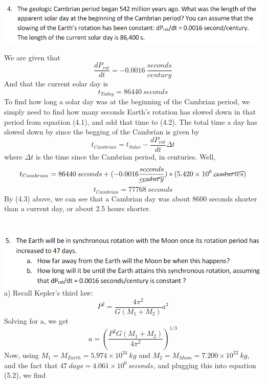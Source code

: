 \documentclass{article}
\begin{document}
\section{}
\includegraphics[scale = 0.8]{probset2prob4.PNG}

We are given that 
\begin{equation}
    \frac{dP_{rot}}{dt} = -0.0016 \: \frac{seconds}{century}
\end{equation}
And that the current solar day is
\begin{equation}
    t_{Today} = 86440 \: seconds
\end{equation}
To find how long a solar day was at the beginning of the Cambrian period, we simply need to find how many seconds Earth's rotation has slowed down in that period from equation (4.1), and add that time to (4.2).
\newline
The total time a day has slowed down by since the begging of the Cambrian is given by
\[t_{Cambrian} = t_{Solar} - \frac{dP_{rot}}{dt}\Delta t\]
where $\Delta t$ is the time since the Cambrian period, in centuries.
Well,
\[t_{Cambrian} = 86440 \: seconds + (-0.0016 \frac{seconds}{\cancel{century}})*(5.420\times 10^6 \: \cancel{centuries})\]
\begin{equation}
    t_{Cambrian} = 77768 \: seconds
\end{equation}
By (4.3) above, we can see that a Cambrian day was about 8600 seconds shorter than a current day, or about 2.5 hours shorter.

\section{}
\includegraphics[scale = 0.8]{probset2prob5.PNG}
a) Recall Kepler's third law:
\begin{equation}
    P^2 = \frac{4 \pi^2}{G(M_1 + M_2)}a^3
\end{equation}
Solving for a, we get 
\begin{equation}
    a = (\frac{P^2G(M_1+M_2)}{4 \pi^2})^{1/3}
\end{equation}
Now, using $M_1 = M_{Earth} = 5.974 \times 10^{24} \: kg$ and $M_2 = M_{Moon} = 7.200 \times 10^{22} \: kg$, and the fact that $47 \: days = 4.061 \times 10^6 \: seconds$, and plugging this into equation (5.2), we find
\end{document}
